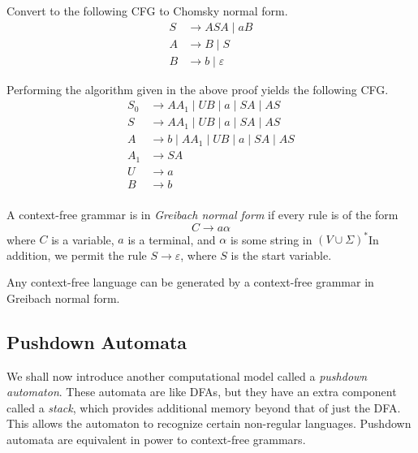 \begin{exercise}
Convert to the following CFG to Chomsky normal form.
\begin{align*}
    S&\to ASA\mid aB \\
    A&\to B\mid S \\
    B&\to b\mid\varepsilon
\end{align*}
\end{exercise}
\begin{solution}
Performing the algorithm given in the above proof yields the following CFG.
\begin{align*}
    S_0&\to AA_1\mid UB\mid a\mid SA\mid AS \\
    S&\to AA_1\mid UB\mid a\mid SA\mid AS \\
    A&\to b\mid AA_1\mid UB\mid a\mid SA\mid AS \\
    A_1&\to SA \\
    U&\to a \\
    B&\to b \\
\end{align*}
\end{solution}

\begin{definition}
    A context-free grammar is in \textit{Greibach normal form} if every rule is of the form
    \[ C \to a\alpha \]
    where $C$ is a variable, $a$ is a terminal, and $\alpha$ is some string in $(V \cup \Sigma)^*$In addition, we permit the rule $S\to\varepsilon$, where $S$ is the start variable.
\end{definition}

\begin{theorem}
    Any context-free language can be generated by a context-free grammar in Greibach normal form.
\end{theorem}

\clearpage

\subsection{Pushdown Automata}
We shall now introduce another computational model called a \textit{pushdown automaton}. These automata are like DFAs, but they have an extra component called a \textit{stack}, which provides additional memory beyond that of just the DFA. This allows the automaton to recognize certain non-regular languages. Pushdown automata are equivalent in power to context-free grammars. 

